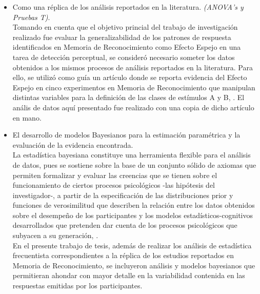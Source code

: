 \begin{itemize}
\item Como una réplica de los análisis reportados en la literatura. \textit{(ANOVA's y Pruebas T)}.\\

Tomando en cuenta que el objetivo princial del trabajo de investigación realizado fue evaluar la generalizabilidad de los patrones de respuesta identificados en Memoria de Reconocimiento como Efecto Espejo en una tarea de detección perceptual, se consideró necesario someter los datos obtenidos a los mismos procesos de análisis reportados en la literatura. Para ello, se utilizó como guía un artículo donde se reporta evidencia del Efecto Espejo en cinco experimentos en Memoria de Reconocimiento que manipulan distintas variables para la definición de las clases de estímulos A y B, \parencite{Glanzer1990}. El anális de datos aquí presentado fue realizado con una copia de dicho artículo en mano.\\ 

\item El desarrollo de modelos Bayesianos para la estimación paramétrica y la evaluación de la evidencia encontrada.\\

La estadística bayesiana constituye una herramienta flexible para el análisis de datos, pues se sostiene sobre la base de un conjunto sólido de axiomas que permiten formalizar y evaluar las creencias que se tienen sobre el funcionamiento de ciertos procesos psicológicos -las hipótesis del investigador-, a partir de la especificación de las distribuciones prior y funciones de verosimilitud que describen la relación entre los datos obtenidos sobre el desempeño de los participantes y los modelos estadísticos-cognitivos desarrollados que pretenden dar cuenta de los procesos psicológicos que subyacen a su generación, \parencite{Lee2011}.\\

En el presente trabajo de tesis, además de realizar los análisis de estadística frecuentista correspondientes a la réplica de los estudios reportados en Memoria de Reconocimiento, se incluyeron análisis y modelos bayesianos que permitieran ahondar con mayor detalle en la variabilidad contenida en las respuestas emitidas por los participantes.\\
\end{itemize}








